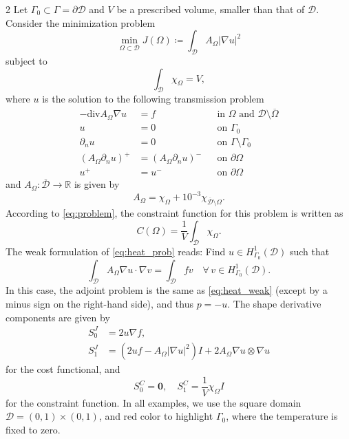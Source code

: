 \documentclass[a4paper, oneside]{article}
\newcommand{\hold}{\mathcal{D}}
\begin{document}
\begin{multicols}{2}
Let $\Gamma_0\subset\Gamma=\partial\hold$ and  $V$ be a prescribed volume, smaller than that of $\mathcal{D}$.
Consider the minimization problem
\begin{equation} \label{eq:heat_cost}
	\min_{\Omega \subset \mathcal{D}}
	J(\Omega) \coloneqq \int_{\mathcal{D}} A_{\Omega}\left|\nabla u\right|^{2}
\end{equation}
subject to
\begin{equation}
	\int_{\mathcal{D}} \chi_{\Omega} = V,
\end{equation}
where $u$ is the solution to the following transmission problem
\begin{equation} \label{eq:heat_prob}
	\begin{aligned}
	-\mathrm{div} A_{\Omega} \nabla u &= f && \text{in } \Omega \text{ and } \mathcal{D}\setminus\overline{\Omega}\\
                                    u &= 0 && \text{on } \Gamma_{0}\\
                       \partial_{n} u &= 0 && \text{on } \Gamma\setminus\Gamma_{0}\\
		(A_{\Omega} \partial_{n} u)^+ &= (A_{\Omega} \partial_{n} u)^- && \text{on }  \partial\Omega\\
							      u^+ &= u^- && \text{on }  \partial\Omega        
	\end{aligned}	
\end{equation}
and $A_{\Omega}:\overline{\mathcal{D}} \rightarrow \mathds{R}$ is given by
\begin{equation}\label{eq:heat_AOmega}
A_{\Omega} = \chi_{\Omega} + {10}^{-3}\chi_{\overline{\mathcal{D}}\setminus\Omega}.
\end{equation}
According to \eqref{eq:problem}, the constraint function for this problem is written as
\begin{equation}
	C(\Omega) = \frac{1}{V} \int_{\mathcal{D}} \chi_{\Omega}.
\end{equation}
%
The weak formulation of \eqref{eq:heat_prob} reads:
Find $u \in  H^1_{\Gamma_0}(\mathcal{D})$ such that
\begin{equation} \label{eq:heat_weak}
	\int_{\mathcal{D}} A_{\Omega} \nabla u \cdot \nabla v =
	\int_{\mathcal{D}} f v
	\quad
	\forall \, v \in  H^1_{\Gamma_0}(\mathcal{D}).
\end{equation}
In this case, the adjoint problem is the same as \eqref{eq:heat_weak}
(except by a minus sign on the right-hand side), and thus $p=-u$.
The shape derivative components are given by
\begin{align*}
	S^J_0 &= 2u\nabla f, \\
	S^J_1 &= (2uf-A_{\Omega}{|\nabla u|}^{2})I +
				2A_{\Omega}\nabla u\otimes\nabla u
\end{align*}
for the cost functional, and
\begin{equation*}
	S^C_0 = \boldsymbol{0},\quad S^C_1 = \frac{1}{V} \chi_\Omega I
\end{equation*}
for the constraint function.
In all examples, we use the square domain $\mathcal{D} = (0, 1)\times(0, 1)$,
and red color to highlight $\Gamma_0$, where the temperature is fixed to zero.


\end{multicols}
\end{document}
